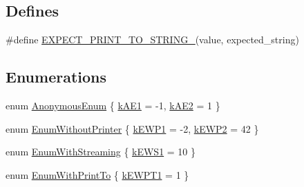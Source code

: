 \subsection*{\-Defines}
\begin{DoxyCompactItemize}
\item 
\#define \hyperlink{gtest-printers__test_8cc_aa0ed482a6777cce04eecd24c530c78ec}{\-E\-X\-P\-E\-C\-T\-\_\-\-P\-R\-I\-N\-T\-\_\-\-T\-O\-\_\-\-S\-T\-R\-I\-N\-G\-\_\-}(value, expected\-\_\-string)
\end{DoxyCompactItemize}
\subsection*{\-Enumerations}
\begin{DoxyCompactItemize}
\item 
enum \hyperlink{gtest-printers__test_8cc_a7a5ee9fe858568a85d80af1312aefb8b}{\-Anonymous\-Enum} \{ \hyperlink{gtest-printers__test_8cc_a7a5ee9fe858568a85d80af1312aefb8ba1a36d0a263e18ed9a4e3562b4cd6e8e6}{k\-A\-E1} =  -\/1, 
\hyperlink{gtest-printers__test_8cc_a7a5ee9fe858568a85d80af1312aefb8ba67ee14379c1b9fd5ae5616a1b3f0d5d5}{k\-A\-E2} =  1
 \}
\item 
enum \hyperlink{gtest-printers__test_8cc_a404f735da62338180a19ae16f80e09c8}{\-Enum\-Without\-Printer} \{ \hyperlink{gtest-printers__test_8cc_a404f735da62338180a19ae16f80e09c8ad65f74b95d76a8a471a823fa69139393}{k\-E\-W\-P1} =  -\/2, 
\hyperlink{gtest-printers__test_8cc_a404f735da62338180a19ae16f80e09c8ae3b0361263e2ff24730ff9f2e2177a11}{k\-E\-W\-P2} =  42
 \}
\item 
enum \hyperlink{gtest-printers__test_8cc_a52d9f846ca7a081ba3acf88dd6cd46dc}{\-Enum\-With\-Streaming} \{ \hyperlink{gtest-printers__test_8cc_a52d9f846ca7a081ba3acf88dd6cd46dca8d4bcf477f5a23ce8569a2a404327839}{k\-E\-W\-S1} =  10
 \}
\item 
enum \hyperlink{gtest-printers__test_8cc_a904d619d593201ed509be794aed041ec}{\-Enum\-With\-Print\-To} \{ \hyperlink{gtest-printers__test_8cc_a904d619d593201ed509be794aed041eca72ccaf1f38be3cad8d1d6b0811467125}{k\-E\-W\-P\-T1} =  1
 \}
\end{DoxyCompactItemize}
